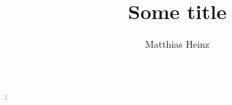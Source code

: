 \documentclass{book}
\title{Some title}
\author{Matthias Heinz}
\begin{document}
\maketitle:

\tableofcontents
\end{document}
